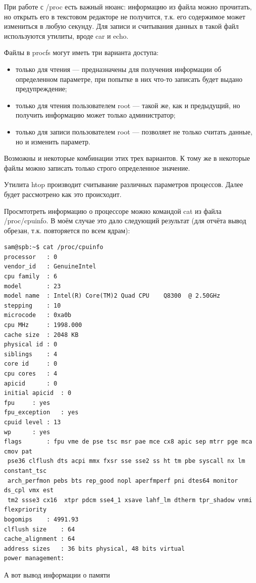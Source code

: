 \documentclass[a4paper, 12pt]{article}		%
\begin{document}
При работе с /proc есть важный нюанс: информацию  из  файла можно прочитать, но открыть его в текстовом редакторе не получится, т.к. его содержимое может измениться в любую секунду. Для записи  и  считывания данных в  такой  файл используются утилиты, вроде car и echo.

Файлы в  procfs могут иметь три варианта доступа:
\begin{itemize}
\item только для чтения — предназначены для получения информации об определенном параметре, при попытке в них что-то записать будет выдано предупреждение;
\item только для чтения пользователем root — такой же, как и предыдущий, но получить информацию может только администратор;
\item только для записи  пользователем root — позволяет не только считать данные, но и  изменить параметр.
\end{itemize}

Возможны и  некоторые комбинации  этих трех вариантов.  К тому же в  некоторые файлы можно записать только строго определенное значение.

Утилита htop производит считывание различных параметров процессов. Далее будет рассмотрено как это происходит.

Просмтотреть информацию о процессоре можно командой cat из файла /proc/cpuinfo. В моём случае это дало следующий результат (для отчёта вывод обрезан, т.к. повторяется по всем ядрам):

\begin{verbatim}
sam@spb:~$ cat /proc/cpuinfo 
processor	: 0
vendor_id	: GenuineIntel
cpu family	: 6
model		: 23
model name	: Intel(R) Core(TM)2 Quad CPU    Q8300  @ 2.50GHz
stepping	: 10
microcode	: 0xa0b
cpu MHz		: 1998.000
cache size	: 2048 KB
physical id	: 0
siblings	: 4
core id		: 0
cpu cores	: 4
apicid		: 0
initial apicid	: 0
fpu		: yes
fpu_exception	: yes
cpuid level	: 13
wp		: yes
flags		: fpu vme de pse tsc msr pae mce cx8 apic sep mtrr pge mca cmov pat
 pse36 clflush dts acpi mmx fxsr sse sse2 ss ht tm pbe syscall nx lm constant_tsc
 arch_perfmon pebs bts rep_good nopl aperfmperf pni dtes64 monitor ds_cpl vmx est
 tm2 ssse3 cx16  xtpr pdcm sse4_1 xsave lahf_lm dtherm tpr_shadow vnmi flexpriority
bogomips	: 4991.93
clflush size	: 64
cache_alignment	: 64
address sizes	: 36 bits physical, 48 bits virtual
power management:
\end{verbatim}

А вот вывод информации о памяти
\end{document}
